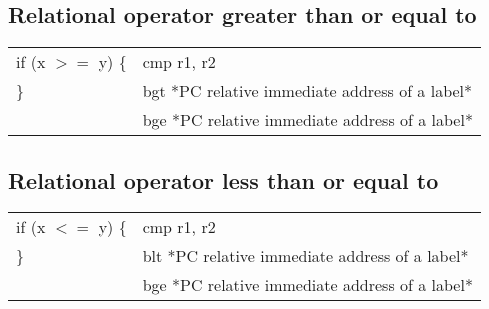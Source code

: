 \documentclass{article}
\begin{document}
\begin{par}
	\subsection{Relational operator greater than or equal to}
	\begin{center}
		\begin{tabular}{|l|l|}
			\hline
			if (x $ >= $ y) \{ & cmp r1, r2 \\
			\} & bgt *PC relative immediate address of a label* \\
			& bge *PC relative immediate address of a label* \\
			\hline
		\end{tabular}
	\end{center}

	\subsection{Relational operator less than or equal to}
	\begin{center}
		\begin{tabular}{|l|l|}
			\hline
			if (x $ <= $ y) \{ & cmp r1, r2 \\
			\} & blt *PC relative immediate address of a label* \\
			& bge *PC relative immediate address of a label* \\
			\hline
		\end{tabular}
	\end{center}


\end{par}
\end{document}
